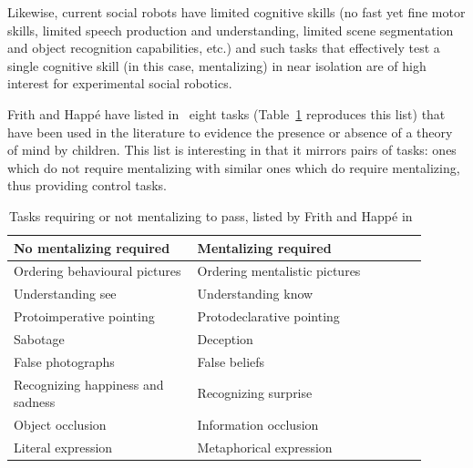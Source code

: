 \documentclass{sig-alternate}
\begin{document}
Likewise, current social robots have limited cognitive skills (no fast yet fine
motor skills, limited speech production and understanding, limited scene
segmentation and object recognition capabilities, etc.) and such tasks
that effectively test a single cognitive skill (in this case, mentalizing) in
near isolation are of high interest for experimental social robotics.

Frith and Happé have listed in~\cite{frith1994autism} eight tasks
(Table~\ref{mentalizing-tasks} reproduces this list) that have been
used in the literature to evidence the presence or absence of a theory of mind
by children. This list is interesting in that it mirrors pairs of tasks: ones
which do not require mentalizing with similar ones which do require mentalizing,
thus providing control tasks.

\begin{table}[h]
    \centering
    \begin{tabular}{p{0.4\linewidth}p{0.5\linewidth}}
        \toprule
        No mentalizing required           & Mentalizing required          \\
        \midrule
        Ordering behavioural pictures     & Ordering mentalistic pictures~\cite{baron1986mechanical} \\
        Understanding see                 & Understanding know~\cite{perner1989exploration}            \\
        Protoimperative pointing          & Protodeclarative pointing~\cite{baron1989perceptual}     \\
        Sabotage                          & Deception~\cite{sodian1992deception}                     \\
        False photographs                 & False beliefs~\cite{leslie1992domain}                 \\
        Recognizing happiness and sadness & Recognizing surprise~\cite{baron1993children}          \\
        Object occlusion                  & Information occlusion~\cite{baron1992out}         \\
        Literal expression                & Metaphorical expression~\cite{happe1993communicative}       \\
        \bottomrule
    \end{tabular}
    \caption{Tasks requiring or not mentalizing to pass, listed by Frith and Happé in~\cite{frith1994autism}}
    \label{mentalizing-tasks}
\end{table}
\end{document}
